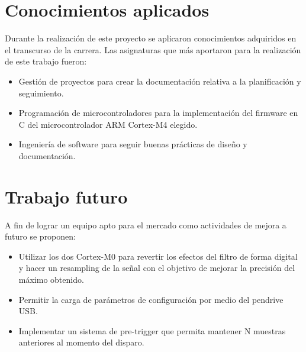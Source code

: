 \newpage
\section{Conocimientos aplicados}

Durante la realización de este proyecto se aplicaron conocimientos adquiridos en el transcurso de la carrera. Las asignaturas que más aportaron para la realización de este trabajo fueron:
\begin{itemize}
\item Gestión de proyectos para crear la documentación relativa a la planificación y seguimiento.
\item Programación de microcontroladores para la implementación del firmware en C del microcontrolador ARM Cortex-M4 elegido.
\item Ingeniería de software para seguir buenas prácticas de diseño y documentación.
\end{itemize}

\section{Trabajo futuro}
A fin de lograr un equipo apto para el mercado como actividades de mejora a futuro se proponen:
\begin{itemize}
\item Utilizar los dos Cortex-M0 para revertir los efectos del filtro de forma digital y hacer un resampling de la señal con el objetivo de mejorar la precisión del máximo obtenido.
\item Permitir la carga de parámetros de configuración por medio del pendrive USB. 
\item Implementar un sistema de pre-trigger que permita mantener N muestras anteriores al momento del disparo.
\end{itemize}
